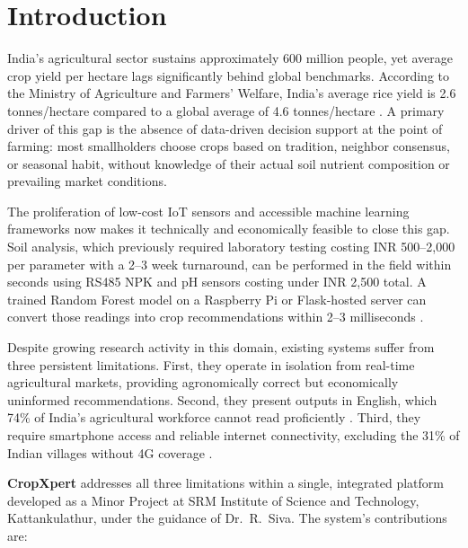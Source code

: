 \documentclass[10pt,twocolumn]{article}
\begin{document}
\section{Introduction}

India's agricultural sector sustains approximately 600 million people, yet average crop yield per hectare lags significantly behind global benchmarks. According to the Ministry of Agriculture and Farmers' Welfare, India's average rice yield is 2.6 tonnes/hectare compared to a global average of 4.6 tonnes/hectare \cite{moafw2022}. A primary driver of this gap is the absence of data-driven decision support at the point of farming: most smallholders choose crops based on tradition, neighbor consensus, or seasonal habit, without knowledge of their actual soil nutrient composition or prevailing market conditions.

The proliferation of low-cost IoT sensors and accessible machine learning frameworks now makes it technically and economically feasible to close this gap. Soil analysis, which previously required laboratory testing costing INR 500--2,000 per parameter with a 2--3 week turnaround, can be performed in the field within seconds using RS485 NPK and pH sensors costing under INR 2,500 total. A trained Random Forest model on a Raspberry Pi or Flask-hosted server can convert those readings into crop recommendations within 2--3 milliseconds \cite{pudumalar2017}.

Despite growing research activity in this domain, existing systems suffer from three persistent limitations. First, they operate in isolation from real-time agricultural markets, providing agronomically correct but economically uninformed recommendations. Second, they present outputs in English, which 74\% of India's agricultural workforce cannot read proficiently \cite{census2011}. Third, they require smartphone access and reliable internet connectivity, excluding the 31\% of Indian villages without 4G coverage \cite{trai2023}.

\textbf{CropXpert} addresses all three limitations within a single, integrated platform developed as a Minor Project at SRM Institute of Science and Technology, Kattankulathur, under the guidance of Dr.~R.~Siva. The system's contributions are:
\end{document}
